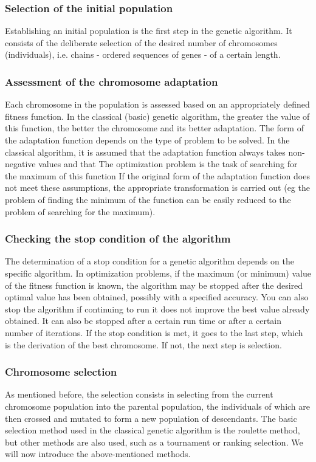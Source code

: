 \subsubsection{Selection of the initial population} 
Establishing an initial population is the first step in the genetic algorithm. 
It consists of the deliberate selection of the desired number of chromosomes (individuals), 
i.e. chains - ordered sequences of genes - of a certain length.

\subsubsection{Assessment of the chromosome adaptation}
Each chromosome in the population is assessed based on an appropriately defined fitness 
function. 
In the classical (basic) genetic algorithm, the greater the value of this function, 
the better the chromosome and its better adaptation. The form of the adaptation function 
depends on the type of problem to be solved. 
In the classical algorithm, it is assumed that the adaptation function always takes 
non-negative values and that The optimization problem is the task of searching for the 
maximum of this function If the original form of the adaptation function does not meet 
these assumptions, the appropriate transformation is carried out (eg the problem of finding 
the minimum of the function can be easily reduced to the problem of searching for the maximum). 

\subsubsection{Checking the stop condition of the algorithm} 
The determination of a stop condition for a genetic algorithm depends on the specific algorithm. 
In optimization problems, if the maximum (or minimum) value of the fitness function is known, 
the algorithm may be stopped after the desired optimal value has been obtained, possibly with 
a specified accuracy. 
You can also stop the algorithm if continuing to run it does not improve the best value 
already obtained. 
It can also be stopped after a certain run time or after a certain number of iterations. 
If the stop condition is met, it goes to the last step, which is the derivation of the best 
chromosome. If not, the next step is selection.

\subsubsection{Chromosome selection} 
As mentioned before, the selection consists in selecting from the current chromosome population into 
the parental population, the individuals of which are then crossed and mutated to form a new 
population of descendants. 
The basic selection method used in the classical genetic algorithm is the roulette method, 
but other methods are also used, such as a tournament or ranking selection. 
We will now introduce the above-mentioned methods. 

